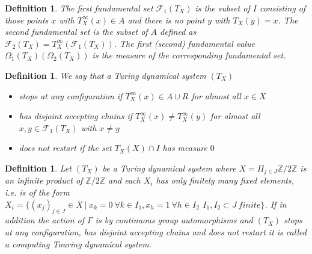 \documentclass[12pt,a4paper]{scrartcl}
\newtheorem{Definition}[Theorem]{Definition}
\numberwithin{equation}{section}
\newcommand{\2}{\mathbb{Z} / 2 \mathbb{Z}}
\newcommand{\1}{\bar{1}}
\newcommand{\0}{\bar{0}}
\begin{document}
\begin{Definition}
	The first fundamental set $\mathcal{F}_1(T_X)$ is the subset of $I$ consisting of those points $x$ with $T_X^\infty(x) \in A$ and there is no point $y$ with $T_X(y)=x$. The second fundamental set is the subset of $A$ defined as $\mathcal{F}_2(T_X)=T_X^\infty(\mathcal{F}_1(T_X))$. The first (second) fundamental value $\Omega_1(T_X) ( \Omega_2(T_X))$ is the measure of the corresponding fundamental set.
\end{Definition}

\begin{Definition}
	We say that a Turing dynamical system $(T_X)$
	\begin{itemize}
		\item stops at any configuration if $T_X^\infty (x) \in A \cup R$ for almost all $x \in X$
		\item has disjoint accepting chains if $T_X^\infty (x) \neq T_X^\infty (y)$ for almost all $x, y \in \mathcal{F}_1(T_X)$ with $x \neq y$
		\item does not restart if the set $T_X(X) \cap I$ has measure $0$
	\end{itemize}
\end{Definition}
 
 
\begin{Definition}
	Let $(T_X)$ be a Turing dynamical system where $X = \Pi_{j \in J} \2$ is an infinite product of $\2$ and each $X_i$  has only finitely many fixed elements, i.e. is of the form $X_i = \{(x_j)_{j \in J} \in X \ | \ x_k = 0 \ \forall k \in I_1, x_h = 1 \ \forall h \in I_2\, \ I_1, I_2 \subset J \ finite\}$. If in addition the action of $\Gamma$ is by continuous group automorphisms and $(T_X)$ stops at any configuration, has disjoint accepting chains and does not restart it is called a computing Touring dynamical system.
\end{Definition}
\end{document}
